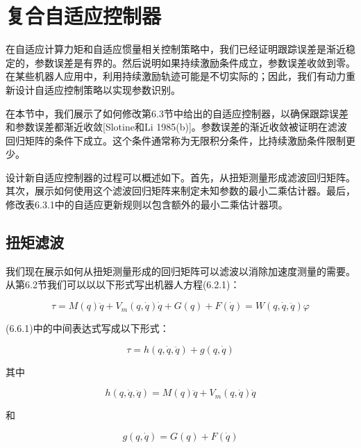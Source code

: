 \documentclass[12pt,a4paper]{ctexart}
\begin{document}
\section{复合自适应控制器}\label{sec:composite}

在自适应计算力矩和自适应惯量相关控制策略中，我们已经证明跟踪误差是渐近稳定的，参数误差是有界的。然后说明如果持续激励条件成立，参数误差收敛到零。在某些机器人应用中，利用持续激励轨迹可能是不切实际的；因此，我们有动力重新设计自适应控制策略以实现参数识别。

在本节中，我们展示了如何修改第6.3节中给出的自适应控制器，以确保跟踪误差和参数误差都渐近收敛[Slotine和Li 1985(b)]。参数误差的渐近收敛被证明在滤波回归矩阵的条件下成立。这个条件通常称为无限积分条件，比持续激励条件限制更少。

设计新自适应控制器的过程可以概述如下。首先，从扭矩测量形成滤波回归矩阵。其次，展示如何使用这个滤波回归矩阵来制定未知参数的最小二乘估计器。最后，修改表6.3.1中的自适应更新规则以包含额外的最小二乘估计器项。

\subsection*{扭矩滤波}

我们现在展示如何从扭矩测量形成的回归矩阵可以滤波以消除加速度测量的需要。从第6.2节我们可以以以下形式写出机器人方程(6.2.1)：

\begin{equation}\label{eq:robot-filter}
\tau = M(q)\ddot{q} + V_m(q, \dot{q})\dot{q} + G(q) + F(\dot{q}) = W(q, \dot{q}, \ddot{q})\varphi
\end{equation}

(6.6.1)中的中间表达式写成以下形式：

\begin{equation}\label{eq:middle-expr}
\tau = h(q, \dot{q}, \ddot{q}) + g(q, \dot{q})
\end{equation}

其中

\begin{equation}\label{eq:h-def}
h(q, \dot{q}, \ddot{q}) = M(q)\ddot{q} + V_m(q, \dot{q})\dot{q}
\end{equation}

和

\begin{equation}\label{eq:g-def}
g(q, \dot{q}) = G(q) + F(\dot{q})
\end{equation}
\end{document}
